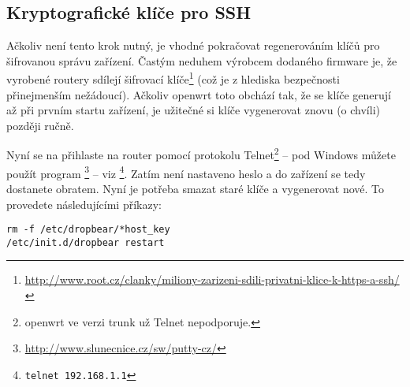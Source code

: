 \subsection{Kryptografické klíče pro SSH}
Ačkoliv není tento krok nutný, je vhodné pokračovat regenerováním klíčů pro
šifrovanou správu zařízení.
Častým neduhem výrobcem dodaného firmware je, že vyrobené routery
sdílejí šifrovací klíče\footnote{\url{http://www.root.cz/clanky/miliony-zarizeni-sdili-privatni-klice-k-https-a-ssh/}}
(což je z hlediska bezpečnosti
přinejmenším nežádoucí). Ačkoliv \gls{openwrt} toto obchází tak, že se klíče
generují až při prvním startu zařízení, je užitečné si klíče vygenerovat znovu
(o chvíli) později ručně.

Nyní se na přihlaste na router pomocí protokolu Telnet\footnote{\gls{openwrt}
ve verzi trunk už Telnet nepodporuje.} -- pod Windows můžete
použít program \footnote{\url{http://www.slunecnice.cz/sw/putty-cz/}} -- viz \footnote{\texttt{telnet 192.168.1.1}}.
Zatím není nastaveno heslo a do zařízení se tedy dostanete obratem.
Nyní je potřeba smazat staré klíče a vygenerovat nové. To provedete následujícími
příkazy:
\begin{verbatim}
rm -f /etc/dropbear/*host_key
/etc/init.d/dropbear restart
\end{verbatim}
